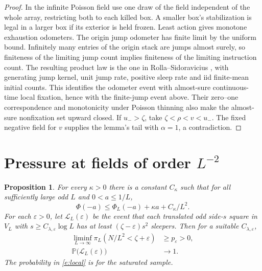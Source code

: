 \documentclass[11pt]{amsart}
\newtheorem{proposition}[theorem]{Proposition}
\newcommand{\Prob}{\mathbb P}
\newcommand{\1}{\mathbf 1}
\begin{document}
\begin{proof}
In the infinite Poisson field use one draw of the field independent of the whole array, restricting both to each killed box. A smaller box's stabilization is legal in a larger box if its exterior is held frozen. Least action gives monotone exhaustion odometers. The origin jump odometer has finite limit by the uniform bound. Infinitely many entries of the origin stack are jumps almost surely, so finiteness of the limiting jump count implies finiteness of the limiting instruction count. The resulting product law is the one in Rolla--Sidoravicius \cite[Lemma~4]{RS}, with generating jump kernel, unit jump rate, positive sleep rate and iid finite-mean initial counts. This identifies the odometer event with almost-sure continuous-time local fixation, hence with the finite-jump event above. Their zero--one correspondence and monotonicity under Poisson thinning also make the almost-sure nonfixation set upward closed. If \(u_->\zeta\), take \(\zeta<\rho<v<u_-\). The fixed negative field for \(v\) supplies the lemma's tail with \(\alpha=1\), a contradiction.
\end{proof}

\section{Pressure at fields of order \texorpdfstring{\(L^{-2}\)}{L to the power -2}}\label{s:small}

\begin{proposition}\label{p:small}
 For every \(\kappa>0\) there is a constant \(C_\kappa\) such that for all sufficiently large odd \(L\) and \(0<a\le1/L\),
 \begin{equation}\label{e:small}
 \Phi(-a)\le\Phi_L(-a)+\kappa a+C_\kappa/L^2.
 \end{equation}
 For each \(\varepsilon>0\), let \(\mathcal L_L(\varepsilon)\) be the event
 that each translated odd side-\(s\) square in \(V_L\) with
 \(s\ge C_{\lambda,\varepsilon}\log L\) has at least
 \((\zeta-\varepsilon)s^2\) sleepers. Then for a suitable
 \(C_{\lambda,\varepsilon}\),
 \begin{align}
 \liminf_{L\to\infty}\pi_L(N/L^2<\zeta+\varepsilon)
     &\ge p_\varepsilon>0, \label{e:low}\\
 \Prob\big(\mathcal L_L(\varepsilon)\big)&\longrightarrow 1 .\label{e:local}
 \end{align}
 The probability in \eqref{e:local} is for the saturated sample.
\end{proposition}
\end{document}
